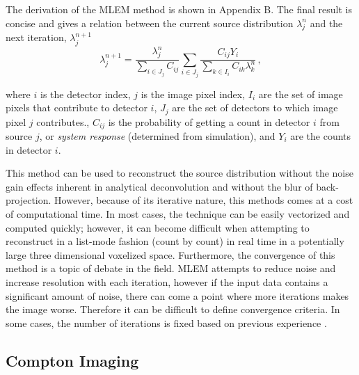 \documentclass[10pt]{article}
\begin{document}
The derivation of the MLEM method is shown in Appendix B. The final result is concise and gives a relation between the current source distribution $\lambda_j^n$ and the next iteration, $\lambda_j^{n+1}$
%
 \begin{equation}
	\lambda_j^{n+1} = \frac{\lambda_j^n}{\sum\limits_{i \in J_j}C_{ij}} \sum_{i \in J_j} \frac{C_{ij}Y_i}{\sum\limits_{k \in I_i}C_{ik}\lambda_k^n}\,,
\end{equation}

\noindent where $i$ is the detector index, $j$ is the image pixel index, $I_i$ are the set of image pixels that contribute to detector $i$, $J_j$ are the set of detectors to which image pixel $j$ contributes., $C_{ij}$ is the probability of getting a count in detector $i$ from source $j$, or \emph{system response} (determined from simulation), and $Y_{i}$ are the counts in detector $i$.

This method can be used to reconstruct the source distribution without the noise gain effects inherent in analytical deconvolution and without the blur of back-projection. However, because of its iterative nature, this methods comes at a cost of computational time. In most cases, the technique can be easily vectorized and computed quickly; however, it can become difficult when attempting to reconstruct in a list-mode fashion (count by count) in real time in a potentially large three dimensional voxelized space. Furthermore, the convergence of this method is a topic of debate in the field. MLEM attempts to reduce noise and increase resolution with each iteration, however if the input data contains a significant amount of noise, there can come a point where more iterations makes the image worse. Therefore it can be difficult to define convergence criteria. In some cases, the number of iterations is fixed based on previous experience \cite{SheppVardi1982, Bissantz2006}.



\subsection{Compton Imaging}
\end{document}

